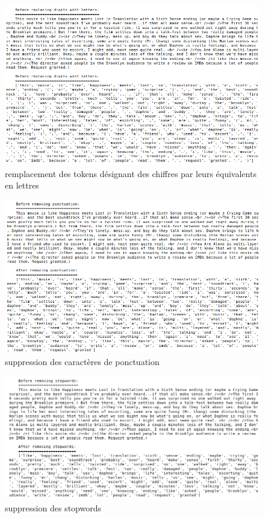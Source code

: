 \documentclass[12pt,a4paper]{report}
\theoremstyle{definition}
\begin{document}
\begin{appendices}
\begin{figure}[!ht]
  \centering
  \includegraphics[scale=0.5]{images/snapshots/preprocessing/replace_numbers.png}
  \caption{remplacement des tokens désignant des chiffres par leurs équivalents en lettres}
  \label{fig:replace_numbers}
\end{figure}

\begin{figure}[!ht]
  \centering
  \includegraphics[scale=0.5]{images/snapshots/preprocessing/remove_punctuation.png}
  \caption{suppression des caractères de ponctuation}
  \label{fig:remove_punctuation}
\end{figure}

\begin{figure}[!ht]
  \centering
  \includegraphics[scale=0.4]{images/snapshots/preprocessing/remove_stopwords.png}
  \caption{suppression des stopwords}
  \label{fig:remove_stopwords}
\end{figure}


\end{appendices}
\end{document}
